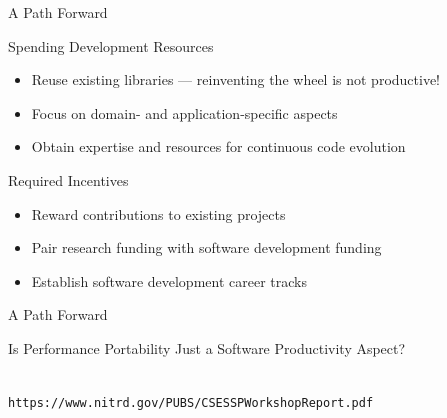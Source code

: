 
\begin{frame}{A Path Forward}
 
 \begin{block}{Spending Development Resources}
  \begin{itemize}
   \item Reuse existing libraries --- reinventing the wheel is not productive!
   \item Focus on domain- and application-specific aspects
   \item Obtain expertise and resources for continuous code evolution
  \end{itemize}
 \end{block}

 \begin{block}{Required Incentives}
  \begin{itemize}
   \item Reward contributions to existing projects
   \item Pair research funding with software development funding
   \item Establish software development career tracks
  \end{itemize}
 \end{block}
 
\end{frame}



\begin{frame}{A Path Forward}
 
 \begin{block}{Is Performance Portability Just a Software Productivity Aspect?}
  \begin{center}
   \\
  {\footnotesize \texttt{https://www.nitrd.gov/PUBS/CSESSPWorkshopReport.pdf}}
  \end{center}
 \end{block}
 
\end{frame}

